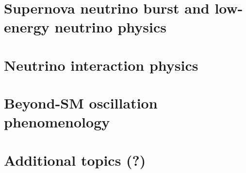\section{Supernova neutrino burst and low-energy neutrino physics}
\label{sec:landscape-snb-lowe}


\section{Neutrino interaction physics}
\label{sec:landscape-nu-interaction}

\section{Beyond-SM oscillation phenomenology}
\label{sec:landscape-bsm}

\section{Additional topics (?)}
\label{sec:landscape-addl}


